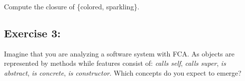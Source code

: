 \documentclass [11pt, a4wide, twoside]{article}
\begin{document}
Compute the closure of \{colored, sparkling\}.


\subsection*{Exercise 3:}
Imagine that you are analyzing a software system with FCA. As objects are represented by methods while features consist of: \emph{calls self}, \emph{calls super}, \emph{is abstract}, \emph{is concrete}, \emph{is constructor}. Which concepts do you expect to emerge?
\end{document}
